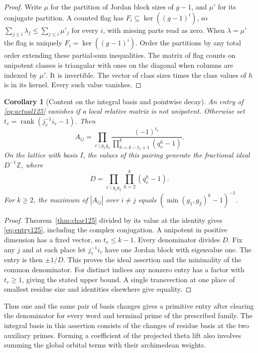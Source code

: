 \documentclass[a4paper,11pt]{article}
\newtheorem{corollary}[proposition]{Corollary}
\theoremstyle{definition}
\theoremstyle{remark}
\newcommand{\ZZ}{\mathbb Z}\newcommand{\ord}{\operatorname{ord}}
\numberwithin{equation}{section}
\begin{document}
\begin{proof}
Write \(\mu\) for the partition of Jordan block sizes of \(g-1\),
and \(\mu'\) for its conjugate partition. A counted flag has
\(F_i\subseteq\ker((g-1)^i)\), so
\(\sum_{j\le i}\lambda_j\le\sum_{j\le i}\mu'_j\) for every \(i\),
with missing parts read as zero.
When \(\lambda=\mu'\) the flag is uniquely
\(F_i=\ker((g-1)^i)\). Order the partitions by any total order
extending these partial-sum inequalities. The matrix of flag
counts on unipotent classes is triangular with ones on the
diagonal when columns are indexed by \(\mu'\).
It is invertible. The vector of class sizes times the class
values of \(h\) is in its kernel. Every such value vanishes.
\end{proof}

\begin{corollary}[Content on the integral basis and pointwise decay]
\label{cor:content125}
An entry of \eqref{eq:actual125} vanishes if a local relative
matrix is not unipotent. Otherwise set
\(t_v=\operatorname{rank}(j_v^{-1}i_v-1)\). Then
\begin{equation}
 A_{ij}=\prod_{v\mid g_1g_2}
     \frac{(-1)^{t_v}}
          {\displaystyle\prod_{h=k-t_v+1}^{k}(q_v^h-1)} .
 \label{eq:entry125}
\end{equation}
On the lattice with basis \(I\), the values of this pairing generate
the fractional ideal \(D^{-1}\ZZ\), where
\begin{equation}
             D=\prod_{v\mid g_1g_2}\prod_{h=2}^{k}(q_v^h-1).
 \label{eq:den125}
\end{equation}
For \(k\ge2\), the maximum of \(|A_{ij}|\) over \(i\ne j\) equals
\((\min(g_1,g_2)^k-1)^{-1}\).
\end{corollary}
\begin{proof}
Theorem~\ref{thm:char125} divided by its value at the identity
gives \eqref{eq:entry125}, including the complex conjugation.
A unipotent in positive dimension has a fixed vector, so
\(t_v\le k-1\). Every denominator divides \(D\).
Fix any \(j\) and at each place let \(j_v^{-1}i_v\) have one
Jordan block with eigenvalue one. The entry is then \(\pm1/D\).
This proves the ideal assertion and the minimality of the common
denominator. For distinct indices any nonzero entry has a factor
with \(t_v\ge1\), giving the stated upper bound. A single
transvection at one place of smallest residue size and identities
elsewhere give equality.
\end{proof}

Thus one and the same pair of basis changes gives a primitive entry
after clearing the denominator for every word and terminal prime
of the prescribed family. The integral basis in this assertion
consists of the changes of residue basis at the two auxiliary
primes. Forming a coefficient of the projected theta lift also
involves summing the global orbital terms with their archimedean
weights.
\end{document}
